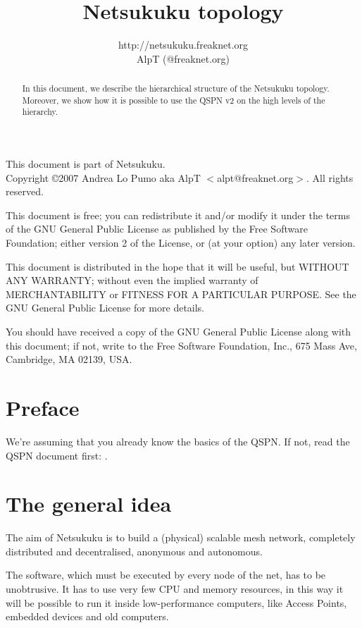 \documentclass[a4paper]{article}
\title{Netsukuku topology}
\author{http://netsukuku.freaknet.org\\AlpT (@freaknet.org)}
\begin{document}
\maketitle
\begin{abstract}
	In this document, we describe the hierarchical structure of the Netsukuku
	topology. Moreover, we show how it is possible to use the QSPN v2 on
	the high levels of the hierarchy.
\end{abstract}
\pagebreak
\begin{small}
  This document is part of Netsukuku.\\
  Copyright \copyright 2007 Andrea Lo Pumo aka AlpT $<$alpt@freaknet.org$>$.
  All rights reserved.

  This document is free; you can redistribute it and/or modify it
  under the terms of the GNU General Public License as published by
  the Free Software Foundation; either version 2 of the License, or
  (at your option) any later version.

  This document is distributed in the hope that it will be useful, but
  WITHOUT ANY WARRANTY; without even the implied warranty of
  MERCHANTABILITY or FITNESS FOR A PARTICULAR PURPOSE\@.  See the GNU
  General Public License for more details.

  You should have received a copy of the GNU General Public License
  along with this document; if not, write to the Free Software
  Foundation, Inc., 675 Mass Ave, Cambridge, MA 02139, USA.
\end{small}

\clearpage
\tableofcontents
\clearpage
{}


\section{Preface}
\label{sec:preface}

We're assuming that you already know the basics of the QSPN. If not, read the
QSPN document first: \cite{qspndoc}.

\section{The general idea}
\label{sec:general_idea}

The aim of Netsukuku is to build a (physical) scalable mesh network, completely
distributed and decentralised, anonymous and autonomous.

The software, which must be executed by every node of the net, has to be
unobtrusive. It has to use very few CPU and memory resources, in this way it
will be possible to run it inside low-performance computers, like Access Points,
embedded devices and old computers.
\end{document}

